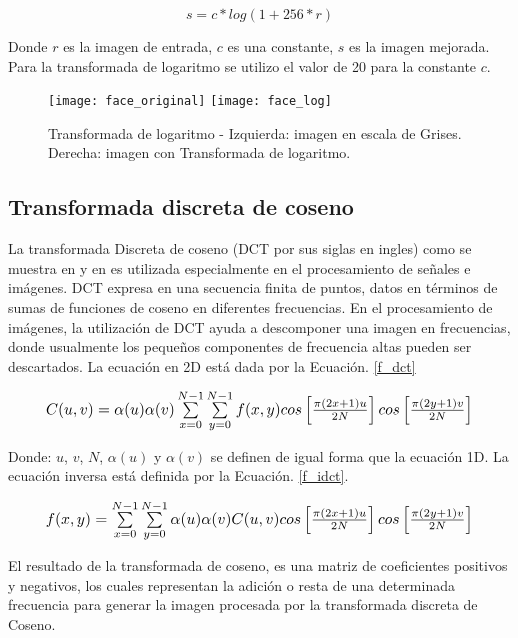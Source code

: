 \begin{equation}
\label{f_log}
s = c*log(1+ 256*r)
\end{equation}

Donde $r$ es la imagen de entrada, $c$ es una constante, $s$ es la imagen mejorada. Para la transformada de logaritmo se utilizo el valor de 20 para la constante $ c $. 

\begin{figure}[h]
\center
\texttt{[image: face\_original]}
\hspace{1cm}
\texttt{[image: face\_log]}
\caption{Transformada de logaritmo - Izquierda: imagen en escala de Grises. Derecha: imagen con Transformada de logaritmo.}
\label{im:log}
\end{figure}

\subsection{Transformada discreta de coseno}
La transformada Discreta de coseno (DCT por sus siglas en ingles) como se muestra en \cite{thamiz2015liter} y en \cite{vish2015ill} es utilizada especialmente en el procesamiento de señales e imágenes. DCT expresa en una secuencia finita de puntos, datos en términos de sumas de funciones de coseno en diferentes frecuencias. En el procesamiento de imágenes, la utilización de DCT ayuda a descomponer una imagen en frecuencias, donde usualmente los pequeños componentes de frecuencia altas pueden ser descartados. La ecuación en 2D está dada por la Ecuación. \ref{f_dct}

\begin{equation}
	\label{f_dct}
	\resizebox{0.91\hsize}{!}{
		$ C(u,v) = \alpha(u)\alpha(v)\sum\limits_{x=0}^{N-1} \sum\limits_{y=0}^{N-1}f(x,y)cos\left[\frac{\pi(2x + 1)u}{2N}\right]cos\left[\frac{\pi(2y + 1)v}{2N}\right] $
	}
\end{equation}

Donde: $u$, $v$, $N$, $\alpha(u)$ y $\alpha(v)$ se definen de igual forma que la ecuación 1D. La ecuación inversa está definida por la Ecuación. \ref{f_idct}.

\begin{equation}
	\label{f_idct}
	\resizebox{0.91\hsize}{!}{
		$ f(x,y) = \sum\limits_{x=0}^{N-1}\sum\limits_{y=0}^{N-1} \alpha(u)\alpha(v)C(u,v)cos\left[\frac{\pi(2x + 1)u}{2N}\right]cos\left[\frac{\pi(2y + 1)v}{2N}\right]$
	}
\end{equation}

El resultado de la transformada de coseno, es una matriz de coeficientes positivos y negativos, los cuales representan la adición o resta de una determinada frecuencia para generar la imagen procesada por la transformada discreta de Coseno.


